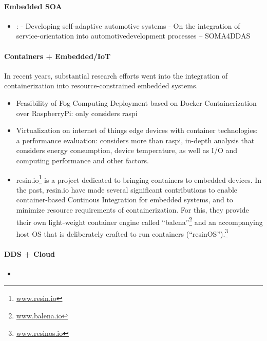 \paragraph{Embedded SOA}

\begin{itemize}
\item \cite{wagner2014developing}: \citeauthor*{wagner2014developing} - Developing self-adaptive automotive systems - On the integration of service-orientation into automotivedevelopment processes -- SOMA4DDAS
\end{itemize}


\paragraph{Containers + Embedded/IoT}
In recent years, substantial research efforts went into the integration of containerization into resource-constrained embedded systems.
\begin{itemize}
	\item \cite{bellavista2017feasibility} Feasibility of Fog Computing Deployment based on Docker Containerization over RaspberryPi: only considers raspi
	\item \cite{morabito2017virtualization} Virtualization on internet of things edge devices with container technologies: a performance evaluation: considers more than raspi, in-depth analysis that considers energy consumption, device temperature, as well as I/O and computing performance and other factors.
	\item resin.io\footnote{\url{www.resin.io}} is a project dedicated to bringing containers to embedded devices. In the past, resin.io have made several significant contributions to enable container-based Continous Integration for embedded systems, and to minimize resource requirements of containerization. For this, they provide their own light-weight container engine called ``balena''\footnote{\url{www.balena.io}} and an accompanying host OS that is deliberately crafted to run containers (``resinOS'').\footnote{\url{www.resinos.io}}
\end{itemize}




\paragraph{DDS + Cloud}
\begin{itemize}
	\item %
\end{itemize}

